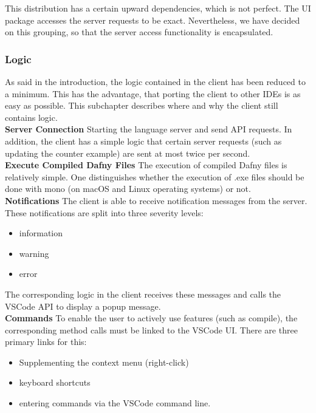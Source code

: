 This distribution has a certain upward dependencies, which is not perfect.
The UI package accesses the server requests to be exact.
Nevertheless, we have decided on this grouping,
so that the server access functionality is encapsulated.

\subsubsection{Logic}
As said in the introduction, the logic contained in the client has been reduced to a minimum.
This has the advantage, that porting the client to other IDEs is as easy as possible.
This subchapter describes where and why the client still contains logic.\\

{\bf Server Connection} \textendash{}
Starting the language server and send API requests. In addition, the client has a simple logic that
certain server requests (such as updating the counter example) are sent at most twice per second. \\

{\bf Execute Compiled Dafny Files} \textendash{}
The execution of compiled Dafny files is relatively simple. One distinguishes whether the execution
of .exe files should be done with mono (on macOS and Linux operating systems) or not. \\

{\bf Notifications} \textendash{}
The client is able to receive notification messages from the server.
These notifications are split into three severity levels:
\begin{itemize}
    \item information
    \item warning
    \item error
\end{itemize}
The corresponding logic in the client receives these messages and calls the VSCode API to display a popup message. \\

{\bf Commands} \textendash{}
To enable the user to actively use features (such as compile),
the corresponding method calls must be linked to the VSCode UI.
There are three primary links for this:
\begin{itemize}
    \item Supplementing the context menu (right-click)
    \item keyboard shortcuts
    \item entering commands via the VSCode command line.
\end{itemize}

